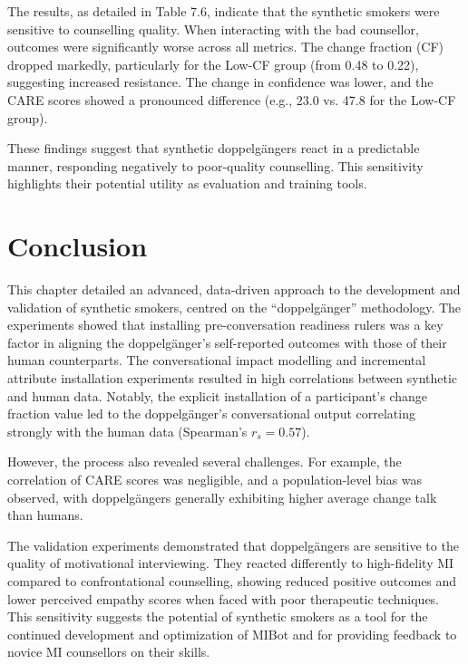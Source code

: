The results, as detailed in Table 7.6, indicate that the synthetic smokers were sensitive to counselling quality. When interacting with the bad counsellor, outcomes were significantly worse across all metrics. The change fraction (CF) dropped markedly, particularly for the Low-CF group (from 0.48 to 0.22), suggesting increased resistance. The change in confidence was lower, and the CARE scores showed a pronounced difference (e.g., 23.0 vs. 47.8 for the Low-CF group).

These findings suggest that synthetic doppelgängers react in a predictable manner, responding negatively to poor-quality counselling. This sensitivity highlights their potential utility as evaluation and training tools.

\section{Conclusion}

This chapter detailed an advanced, data-driven approach to the development and validation of synthetic smokers, centred on the ``doppelgänger'' methodology. The experiments showed that installing pre-conversation readiness rulers was a key factor in aligning the doppelgänger's self-reported outcomes with those of their human counterparts. The conversational impact modelling and incremental attribute installation experiments resulted in high correlations between synthetic and human data. Notably, the explicit installation of a participant's change fraction value led to the doppelgänger's conversational output correlating strongly with the human data (Spearman's $r_{s}=0.57$).

However, the process also revealed several challenges. For example, the correlation of CARE scores was negligible, and a population-level bias was observed, with doppelgängers generally exhibiting higher average change talk than humans.

The validation experiments demonstrated that doppelgängers are sensitive to the quality of motivational interviewing. They reacted differently to high-fidelity MI compared to confrontational counselling, showing reduced positive outcomes and lower perceived empathy scores when faced with poor therapeutic techniques. This sensitivity suggests the potential of synthetic smokers as a tool for the continued development and optimization of MIBot and for providing feedback to novice MI counsellors on their skills.